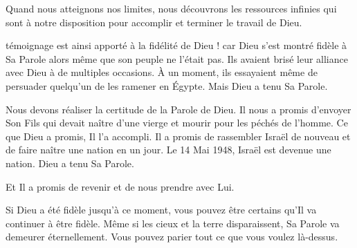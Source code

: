 Quand nous atteignons nos limites, nous découvrons les ressources infinies
 qui sont à notre disposition pour accomplir et terminer le travail de Dieu.

\dvrule






 témoignage est ainsi apporté
 à la fidélité de Dieu ! \ocadr car Dieu s'est montré fidèle
 à Sa Parole alors même que son peuple ne l'était pas.
 Ils avaient brisé leur alliance avec Dieu à de multiples occasions.
 \`A un moment, ils essayaient même de persuader quelqu'un
 de les ramener en Égypte. Mais Dieu a tenu Sa Parole.


Nous devons réaliser la certitude de la Parole de Dieu.
 Il nous a promis d'envoyer Son Fils qui devait naître
 d'une vierge et mourir pour les péchés de l'homme.
 Ce que Dieu a promis, Il l'a accompli.
 Il a promis de rassembler Israël de nouveau
 et de faire naître une nation en un jour.
 Le 14 Mai 1948, Israël est devenue une nation. Dieu a tenu Sa Parole.

Et Il a promis de revenir et de nous prendre avec Lui.

Si Dieu a été fidèle jusqu'à ce moment, vous pouvez être certains
 qu'Il va continuer à être fidèle. Même si les cieux et la terre disparaissent,
 Sa Parole va demeurer éternellement.
 Vous pouvez parier tout ce que vous voulez là-dessus. 

